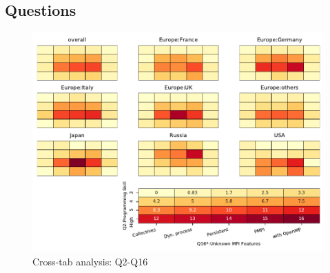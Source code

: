 
\subsection{Questions}


\begin{figure}
\begin{center}
\includegraphics[width=12cm]{../pdfs/Q2-Q16.pdf}
\caption{Cross-tab analysis: Q2-Q16}
\label{fig:Q2-Q16}
\end{center}
\end{figure}
